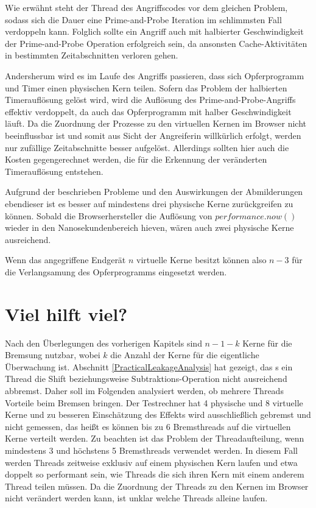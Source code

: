 Wie erwähnt steht der Thread des Angriffscodes vor dem gleichen Problem, sodass sich die Dauer eine Prime-and-Probe Iteration im schlimmsten Fall verdoppeln kann.
Folglich sollte ein Angriff auch mit halbierter Geschwindigkeit der Prime-and-Probe Operation erfolgreich sein, da ansonsten Cache-Aktivitäten in bestimmten Zeitabschnitten verloren gehen.

Andersherum wird es im Laufe des Angriffs passieren, dass sich Opferprogramm und Timer einen physischen Kern teilen.
Sofern das Problem der halbierten Timerauflösung gelöst wird, wird die Auflösung des Prime-and-Probe-Angriffs effektiv verdoppelt, da auch das Opferprogramm mit halber Geschwindigkeit läuft.
Da die Zuordnung der Prozesse zu den virtuellen Kernen im Browser nicht beeinflussbar ist und somit aus Sicht der Angreiferin willkürlich erfolgt, werden nur zufällige Zeitabschnitte besser aufgelöst.
Allerdings sollten hier auch die Kosten gegengerechnet werden, die für die Erkennung der veränderten Timerauflösung entstehen.

Aufgrund der beschrieben Probleme und den Auswirkungen der Abmilderungen ebendieser ist es besser auf mindestens drei physische Kerne zurückgreifen zu können.
Sobald die Browserhersteller die Auflösung von $performance.now()$ wieder in den Nanosekundenbereich hieven, wären auch zwei physische Kerne ausreichend. 

Wenn das angegriffene Endgerät $n$ virtuelle Kerne besitzt können also $n-3$ für die Verlangsamung des Opferprogramms eingesetzt werden.

\section{Viel hilft viel?}

Nach den Überlegungen des vorherigen Kapitels sind $n-1-k$ Kerne für die Bremsung nutzbar, wobei $k$ die Anzahl der Kerne für die eigentliche Überwachung ist. Abschnitt \ref{PracticalLeakageAnalysis} hat gezeigt, das s ein Thread die Shift beziehungsweise Subtraktions-Operation nicht ausreichend abbremst.
Daher soll im Folgenden analysiert werden, ob mehrere Threads Vorteile beim Bremsen bringen.
Der Testrechner hat 4 physische und 8 virtuelle Kerne und zu besseren Einschätzung des Effekts wird ausschließlich gebremst und nicht gemessen, das heißt es können bis zu 6 Bremsthreads auf die virtuellen Kerne verteilt werden.
Zu beachten ist das Problem der Threadaufteilung, wenn mindestens 3 und höchstens 5 Bremsthreads verwendet werden.
In diesem Fall werden Threads zeitweise exklusiv auf einem physischen Kern laufen und etwa doppelt so performant sein, wie Threads die sich ihren Kern mit einem anderem Thread teilen müssen.
Da die Zuordnung der Threads zu den Kernen im Browser nicht verändert werden kann, ist unklar welche Threads alleine laufen.

